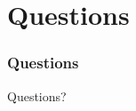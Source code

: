 \section*{Questions}

\begin{frame}
\frametitle{Questions}
\begin{center}
Questions?
\end{center}
\end{frame}


%
%


